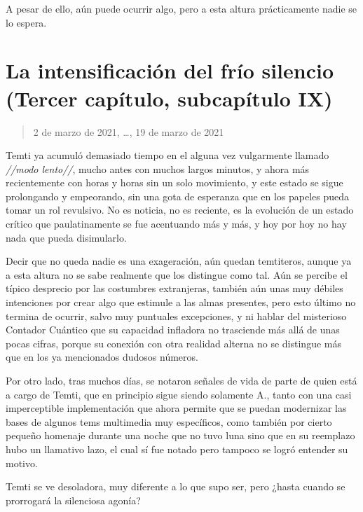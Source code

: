 \documentclass[
  spanish,
]{book}
\begin{document}
A pesar de ello, aún puede ocurrir algo, pero a esta altura prácticamente nadie se lo espera.

\hypertarget{la-intensificaciuxf3n-del-fruxedo-silencio-tercer-capuxedtulo-subcapuxedtulo-ix}{%
\section{La intensificación del frío silencio (Tercer capítulo, subcapítulo IX)}\label{la-intensificaciuxf3n-del-fruxedo-silencio-tercer-capuxedtulo-subcapuxedtulo-ix}}

\begin{quote}
2 de marzo de 2021, \ldots, 19 de marzo de 2021
\end{quote}

Temti ya acumuló demasiado tiempo en el alguna vez vulgarmente llamado \emph{//modo lento//}, mucho antes con muchos largos minutos, y ahora más recientemente con horas y horas sin un solo movimiento, y este estado se sigue prolongando y empeorando, sin una gota de esperanza que en los papeles pueda tomar un rol revulsivo. No es noticia, no es reciente, es la evolución de un estado crítico que paulatinamente se fue acentuando más y más, y hoy por hoy no hay nada que pueda disimularlo.

Decir que no queda nadie es una exageración, aún quedan temtiteros, aunque ya a esta altura no se sabe realmente que los distingue como tal. Aún se percibe el típico desprecio por las costumbres extranjeras, también aún unas muy débiles intenciones por crear algo que estimule a las almas presentes, pero esto último no termina de ocurrir, salvo muy puntuales excepciones, y ni hablar del misterioso Contador Cuántico que su capacidad infladora no trasciende más allá de unas pocas cifras, porque su conexión con otra realidad alterna no se distingue más que en los ya mencionados dudosos números.

Por otro lado, tras muchos días, se notaron señales de vida de parte de quien está a cargo de Temti, que en principio sigue siendo solamente A., tanto con una casi imperceptible implementación que ahora permite que se puedan modernizar las bases de algunos tems multimedia muy específicos, como también por cierto pequeño homenaje durante una noche que no tuvo luna sino que en su reemplazo hubo un llamativo lazo, el cual sí fue notado pero tampoco se logró entender su motivo.

Temti se ve desoladora, muy diferente a lo que supo ser, pero ¿hasta cuando se prorrogará la silenciosa agonía?
\end{document}
